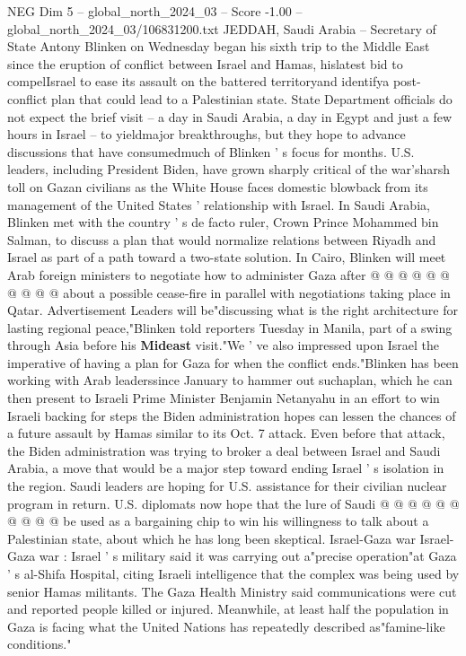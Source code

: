 \begin{textsample}{NEG Dim 5 – global\_north\_2024\_03 – Score -1.00 – global\_north\_2024\_03/106831200.txt}  \label{ex:f5_neg_168}
JEDDAH, Saudi Arabia -- Secretary of State Antony Blinken on Wednesday began his sixth trip to the Middle East since the eruption of conflict between Israel and Hamas, hislatest bid to compelIsrael to ease its assault on the battered territoryand identifya post-conflict plan that could lead to a Palestinian state.
State Department officials do not expect the brief visit -- a day in Saudi Arabia, a day in Egypt and just a few hours in Israel -- to yieldmajor breakthroughs, but they hope to advance discussions that have consumedmuch of Blinken ' s focus for months.
U.S. leaders, including President Biden, have grown sharply critical of the war'sharsh toll on Gazan civilians as the White House faces domestic blowback from its management of the United States ' relationship with Israel.
In Saudi Arabia, Blinken met with the country ' s de facto ruler, Crown Prince Mohammed bin Salman, to discuss a plan that would normalize relations between Riyadh and Israel as part of a path toward a two-state solution.
In Cairo, Blinken will meet Arab foreign ministers to negotiate how to administer Gaza after @ @ @ @ @ @ @ @ @ @ about a possible cease-fire in parallel with negotiations taking place in Qatar.
Advertisement Leaders will be"discussing what is the right architecture for lasting regional peace,"Blinken told reporters Tuesday in Manila, part of a swing through Asia before his \textbf{Mideast} visit."We ' ve also impressed upon Israel the imperative of having a plan for Gaza for when the conflict ends."Blinken has been working with Arab leaderssince January to hammer out suchaplan, which he can then present to Israeli Prime Minister Benjamin Netanyahu in an effort to win Israeli backing for steps the Biden administration hopes can lessen the chances of a future assault by Hamas similar to its Oct. 7 attack.
Even before that attack, the Biden administration was trying to broker a deal between Israel and Saudi Arabia, a move that would be a major step toward ending Israel ' s isolation in the region.
Saudi leaders are hoping for U.S. assistance for their civilian nuclear program in return.
U.S. diplomats now hope that the lure of Saudi @ @ @ @ @ @ @ @ @ @ be used as a bargaining chip to win his willingness to talk about a Palestinian state, about which he has long been skeptical.
Israel-Gaza war Israel-Gaza war : Israel ' s military said it was carrying out a"precise operation"at Gaza ' s al-Shifa Hospital, citing Israeli intelligence that the complex was being used by senior Hamas militants.
The Gaza Health Ministry said communications were cut and reported people killed or injured.
Meanwhile, at least half the population in Gaza is facing what the United Nations has repeatedly described as"famine-like conditions."

\end{textsample}
